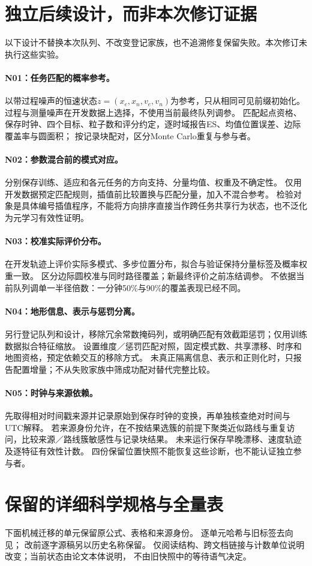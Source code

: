 \section{独立后续设计，而非本次修订证据}\label{sec:follow-up-designs}\hypertarget{sec:follow-up-designs}{}
以下设计不替换本次队列、不改变登记家族，也不追溯修复保留失败。本次修订未执行这些实验。
\paragraph{N01：任务匹配的概率参考。}
以带过程噪声的恒速状态$z=(x_e,x_n,v_e,v_n)$为参考，只从相同可见前缀初始化。
过程与测量噪声在开发数据上选择，不使用当前最终队列调参。
匹配起点资格、保存时钟、四个目标、粒子数和评分约定，逐时域报告ES、均值位置误差、边际覆盖率与圆面积；
按记录块配对，区分Monte Carlo重复与参与者。
\paragraph{N02：参数混合前的模式对应。}
分别保存训练、适应和各元任务的方向支持、分量均值、权重及不确定性。
仅用开发数据预定匹配规则，插值前比较置换与匹配分量，加入不混合参考。
检验对象是具体编号插值程序，不能将方向排序直接当作跨任务共享行为状态，也不泛化为元学习有效性证明。
\paragraph{N03：校准实际评价分布。}
在开发轨迹上评价实际多模式、多步位置分布，拟合与验证保持分量标签及概率权重一致。
区分边际圆校准与同时路径覆盖；新最终评价之前冻结调参。
不依据当前队列调单一半径倍数：一分钟50\%与90\%的覆盖表现已经不同。
\paragraph{N04：地形信息、表示与惩罚分离。}
另行登记队列和设计，移除冗余常数掩码列，或明确匹配有效截距惩罚；仅用训练数据拟合特征缩放。
设置维度／惩罚匹配对照，固定模式数、共享漂移、时序和地图资格，预定依赖交互的移除方式。
未真正隔离信息、表示和正则化时，只报告配置增量；不从失败家族中筛成功配对替代完整比较。
\paragraph{N05：时钟与来源依赖。}
先取得相对时间戳来源并记录原始到保存时钟的变换，再单独核查绝对时间与UTC解释。
若来源身份允许，在不按结果选簇的前提下聚类近似路线与重复访问，比较来源／路线簇敏感性与记录块结果。
未来运行保存早晚漂移、速度轨迹及逐特征有效性计数。
四份保留位置快照不能恢复这些诊断，也不能认证独立参与者。

\section{保留的详细科学规格与全量表}
下面机械迁移的单元保留原公式、表格和来源身份。
逐单元哈希与旧标签去向见；
改前逐字源稿另以历史名称保留。
仅阅读结构、跨文档链接与计数单位说明改变；当前状态由论文本体说明，
不由旧快照中的等待语气决定。



